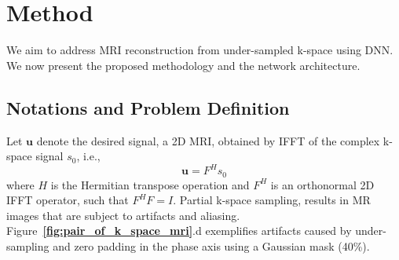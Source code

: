 \documentclass[10pt,journal,compsoc]{IEEEtran}
\begin{document}
\section{Method}\label{method_section}
We aim to address MRI reconstruction from under-sampled k-space using DNN. We now present the proposed methodology and the network architecture.
\subsection{Notations and Problem Definition}
Let $\bm{u}$ denote the desired signal, a 2D MRI, obtained by IFFT of the complex k-space signal $s_{0}$, i.e., 
\begin{equation}
\bm{u}=F^{H}s_{0}
\end{equation} 
where $H$ is the Hermitian transpose operation and $F^{H}$ is an orthonormal 2D IFFT operator, such that $F^{H}F=I$. 
Partial k-space sampling, results in MR images that are subject to artifacts and aliasing. 
Figure~\textbf{\ref{fig:pair_of_k_space_mri}}.d exemplifies artifacts caused by under-sampling and zero padding in the phase axis using a Gaussian mask (40\%).
\vspace{-0.5cm}
\end{document}
